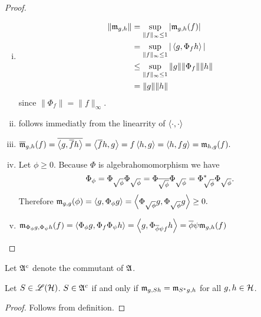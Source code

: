 \begin{proof}
 \begin{enumerate}[(i)]
  \item \begin{align*}
         \| \mathfrak{m}_{g,h} \| &= \sup\limits_{\| f \| _\infty \leq 1} | \mathfrak{m}_{g,h}(f) | \\
			&= \sup\limits_{\| f \| _\infty \leq 1} | \left\langle g, \Phi_f h \right\rangle | \\
			&\leq \sup\limits_{\| f \| _\infty \leq 1} \| g \| \|\Phi_f \| \| h\| \\
			&= \|g\| \|h\|
        \end{align*}
  since $\|\Phi_f \| =\| f \|_\infty$.
 \item follows immediatly from the linearrity of $\left\langle \cdot , \cdot \right\rangle$
 
 \item $\overline{\mathfrak{m}}_{g,h}(f) = \overline{\left\langle g, \overline{f}h \right\rangle} = 
       \left\langle \overline{f}h ,g \right\rangle =	f\left\langle h,g \right\rangle = \left\langle h, fg \right\rangle = \mathfrak{m}_{h,g}(f).$
	
 \item Let $\phi \geq 0$. Because $\Phi$ is algebrahomomorphism we have 
	\[
	  \Phi_\phi = \Phi_{\sqrt{\phi}} \Phi_{\sqrt{\phi}} = 
	  \Phi_{\overline{\sqrt{\phi}}} \Phi_{\sqrt{\phi}} =
	  \Phi_{\sqrt{\phi}}^{*} \Phi_{\sqrt{\phi}}.
	\]
	Therefore $\mathfrak{m}_{g,g}(\phi) = \left\langle g, \Phi_\phi g \right\rangle = \left\langle \Phi_{\sqrt{\phi}}g,
	\Phi_{\sqrt{\phi}}g \right\rangle \geq 0. $
	
 \item	$\mathfrak{m}_{\Phi_\phi g, \Phi_\psi h} (f ) = \left\langle \Phi_\phi g, \Phi_f 
	\Phi_\psi h \right\rangle = \left\langle g , \Phi_{\overline{\phi} \psi f} h  \right\rangle = \overline{\phi}
	\psi \mathfrak{m}_{g,h}(f)$ 

\end{enumerate}

\end{proof}

Let $\mathfrak{A} ^c $ denote the commutant of $\mathfrak{A}$.

\begin{lem}
 Let $S \in \mathscr{L}(\mathcal{H})$. $S \in \mathfrak{A} ^c$ if and only if $\mathfrak{m}_{g, Sh} = \mathfrak{m}_{S ^{*} g, h}$ 
 for all $g, h \in \mathcal{H}$. 
\end{lem}

\begin{proof}
 Follows from definition.
\end{proof}

